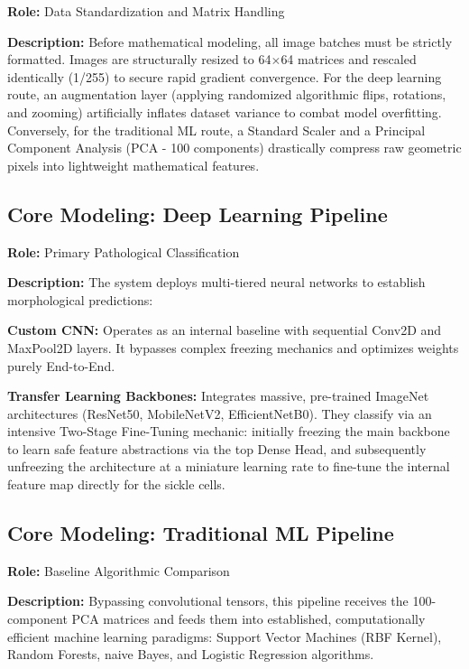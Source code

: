 \noindent\textbf{Role:} Data Standardization and Matrix Handling

\noindent\textbf{Description:} Before mathematical modeling, all image batches must be strictly formatted. Images are structurally resized to 64$\times$64 matrices and rescaled identically (1/255) to secure rapid gradient convergence. For the deep learning route, an augmentation layer (applying randomized algorithmic flips, rotations, and zooming) artificially inflates dataset variance to combat model overfitting. Conversely, for the traditional ML route, a Standard Scaler and a Principal Component Analysis (PCA - 100 components) drastically compress raw geometric pixels into lightweight mathematical features.

\subsection{Core Modeling: Deep Learning Pipeline}

\noindent\textbf{Role:} Primary Pathological Classification

\noindent\textbf{Description:} The system deploys multi-tiered neural networks to establish morphological predictions:

\noindent\textbf{Custom CNN:} Operates as an internal baseline with sequential Conv2D and MaxPool2D layers. It bypasses complex freezing mechanics and optimizes weights purely End-to-End.

\noindent\textbf{Transfer Learning Backbones:} Integrates massive, pre-trained ImageNet architectures (ResNet50, MobileNetV2, EfficientNetB0). They classify via an intensive Two-Stage Fine-Tuning mechanic: initially freezing the main backbone to learn safe feature abstractions via the top Dense Head, and subsequently unfreezing the architecture at a miniature learning rate to fine-tune the internal feature map directly for the sickle cells.

\subsection{Core Modeling: Traditional ML Pipeline}

\noindent\textbf{Role:} Baseline Algorithmic Comparison

\noindent\textbf{Description:} Bypassing convolutional tensors, this pipeline receives the 100-component PCA matrices and feeds them into established, computationally efficient machine learning paradigms: Support Vector Machines (RBF Kernel), Random Forests, naive Bayes, and Logistic Regression algorithms.

